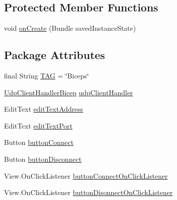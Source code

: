 \subsection*{Protected Member Functions}
\begin{DoxyCompactItemize}
\item 
void \mbox{\hyperlink{classcom_1_1example_1_1trainawearapplication_1_1_biceps_abcdfd60742e9da12033fad625275ca4f}{on\+Create}} (Bundle saved\+Instance\+State)
\end{DoxyCompactItemize}
\subsection*{Package Attributes}
\begin{DoxyCompactItemize}
\item 
final String \mbox{\hyperlink{classcom_1_1example_1_1trainawearapplication_1_1_biceps_a7ceefbdf1885bee16f561985785d1305}{T\+AG}} = \char`\"{}Biceps\char`\"{}
\item 
\mbox{\hyperlink{classcom_1_1example_1_1trainawearapplication_1_1_udp_client_handler_bicep}{Udp\+Client\+Handler\+Bicep}} \mbox{\hyperlink{classcom_1_1example_1_1trainawearapplication_1_1_biceps_a25568b424bff07722b8f7fc02bd548a5}{udp\+Client\+Handler}}
\item 
Edit\+Text \mbox{\hyperlink{classcom_1_1example_1_1trainawearapplication_1_1_biceps_a730a4bd0cc9e94ae18720f57e29401fd}{edit\+Text\+Address}}
\item 
Edit\+Text \mbox{\hyperlink{classcom_1_1example_1_1trainawearapplication_1_1_biceps_a63d8e382db5149cf2ca44edefc491a51}{edit\+Text\+Port}}
\item 
Button \mbox{\hyperlink{classcom_1_1example_1_1trainawearapplication_1_1_biceps_a6625e0e7f0742b9cf4331b671f8fe1e4}{button\+Connect}}
\item 
Button \mbox{\hyperlink{classcom_1_1example_1_1trainawearapplication_1_1_biceps_a99fe265e903a4d064e91d0387880a19c}{button\+Disconnect}}
\item 
View.\+On\+Click\+Listener \mbox{\hyperlink{classcom_1_1example_1_1trainawearapplication_1_1_biceps_af01aa7bfdd03a89b0e5a61e898716a60}{button\+Connect\+On\+Click\+Listener}}
\item 
View.\+On\+Click\+Listener \mbox{\hyperlink{classcom_1_1example_1_1trainawearapplication_1_1_biceps_ad58ec4102a1cc5e69b96ecc17028845a}{button\+Disonnect\+On\+Click\+Listener}}
\end{DoxyCompactItemize}

